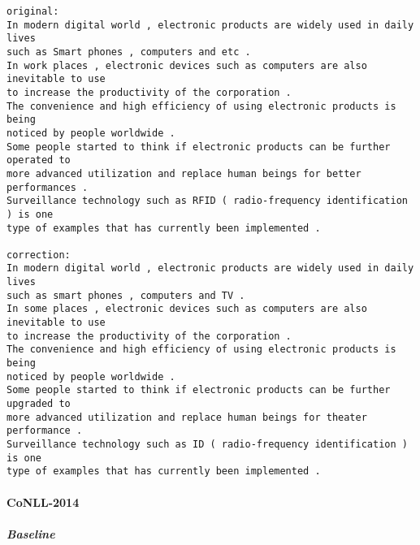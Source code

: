 \documentclass[10pt]{article}
\begin{document}
    \begin{Verbatim}[commandchars=\\\{\}]
original:
In modern digital world , electronic products are widely used in daily lives
such as Smart phones , computers and etc .
In work places , electronic devices such as computers are also inevitable to use
to increase the productivity of the corporation .
The convenience and high efficiency of using electronic products is being
noticed by people worldwide .
Some people started to think if electronic products can be further operated to
more advanced utilization and replace human beings for better performances .
Surveillance technology such as RFID ( radio-frequency identification ) is one
type of examples that has currently been implemented .

correction:
In modern digital world , electronic products are widely used in daily lives
such as smart phones , computers and TV .
In some places , electronic devices such as computers are also inevitable to use
to increase the productivity of the corporation .
The convenience and high efficiency of using electronic products is being
noticed by people worldwide .
Some people started to think if electronic products can be further upgraded to
more advanced utilization and replace human beings for theater performance .
Surveillance technology such as ID ( radio-frequency identification ) is one
type of examples that has currently been implemented .
    \end{Verbatim}

    \hypertarget{conll-2014}{%
\paragraph{CoNLL-2014}\label{conll-2014}}

    \hypertarget{baseline}{%
\subparagraph{Baseline}\label{baseline}}
\end{document}
